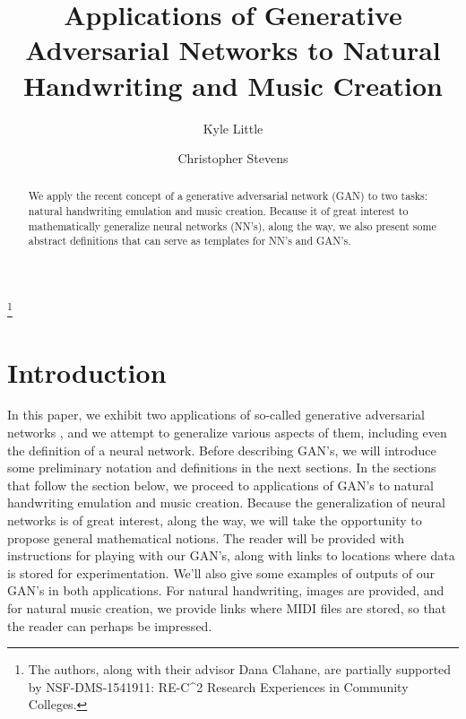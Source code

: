 \documentclass[12pt]{amsart}
\theoremstyle{definition}
\theoremstyle{remark}
\begin{document}
\title[Applications of Generative Adversarial Networks]{Applications of Generative Adversarial Networks to Natural Handwriting and Music Creation}

\thanks{The authors, along with their advisor Dana Clahane, are partially supported by NSF-DMS-1541911: RE-C\^{}2\: Research Experiences in Community Colleges.}

\author[K.Little]{Kyle Little}

\author[C.Stevens]{Christopher Stevens}

\address{ Mathematics and Computer Science Division, \newline
        Fullerton College, 321 E. Chapman, Fullerton, CA 92832-2095
}

\begin{abstract}
We apply the recent concept of a generative adversarial network (GAN) to two tasks: natural handwriting emulation and music creation.  Because it of great interest to mathematically generalize neural networks (NN's), along the way, we also present some abstract definitions that can serve as templates for NN's and GAN's.
\end{abstract} 

\maketitle
\section{Introduction}

In this paper, we exhibit two applications of so-called generative adversarial networks \cite{1406.2661}, and we attempt to generalize various aspects of them, including even the definition of a neural network.  Before describing GAN's, we will introduce some preliminary notation and definitions in the next sections.  In the sections that follow the section below, we proceed to applications of GAN's to natural handwriting emulation and music creation.  Because the generalization of neural networks is of great interest, along the way, we will take the opportunity to propose general mathematical notions.  The reader will be provided with instructions for playing with our GAN's, along with links to locations where data is stored for experimentation.  We'll also give some examples of outputs of our GAN's in both applications.  For natural handwriting, images are provided, and for natural music creation, we provide links where MIDI files are stored, so that the reader can perhaps be impressed.
\end{document}
